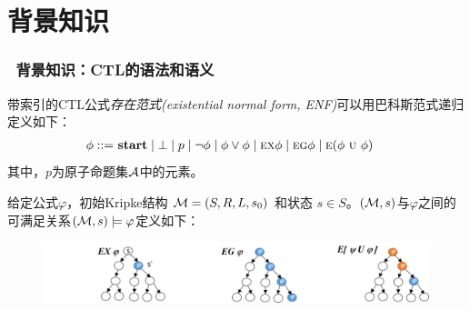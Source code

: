 \documentclass[aspectratio=1610, 9pt, CJK]{beamer}
\begin{document}
\section{背景知识}
\begin{frame} 
	\frametitle{~背景知识：CTL的语法和语义}
		\begin{definition}[CTL的语法]
			带索引的CTL公式\emph{存在范式(existential normal form, ENF)}可以用巴科斯范式递归定义如下：
			\begin{align*}
				\phi  ::= & \ \start\mid \bot %
				\mid p \mid\neg\phi \mid \phi\lor\phi \mid
				\EXIST \NEXT \phi \mid
				\EXIST \GLOBAL \phi \mid 
				\EXIST (\phi\ \UNTILL\ \phi)
			\end{align*}
			其中，$p$为原子命题集${\cal A}$中的元素。%
		\end{definition} 
		\begin{definition}[CTL的语义]\label{def:ctl:semantic}
			给定公式$\varphi$，初始Kripke结构 ${\cal M}=(S,R,L,s_0)$ 和状态 $s\in S$。$({\cal M},s)$与$\varphi$之间的可满足关系$({\cal M},s)\models \varphi$定义如下：
			\begin{figure}
				\includegraphics[scale=0.3]{figures/semanticCTL1}
			\end{figure}
		\end{definition} 
\end{frame}
\end{document}
